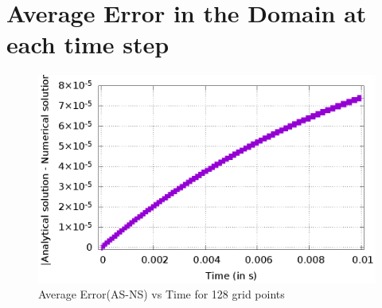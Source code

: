 \documentclass[12pt]{article}
\begin{document}
	\newpage
	
	\section{Average Error in the Domain at each time step}
		
	\begin{figure}[h]
		\centering
		\includegraphics[scale=1.05, angle=90]{"Gnuplot/Error_vs_time_for_128_grid_points.eps"}
		\caption{Average Error(AS-NS) vs Time for 128 grid points}	
	\end{figure}
	

%	
	
%	

	\appendix
		
	
	
	
\end{document}
